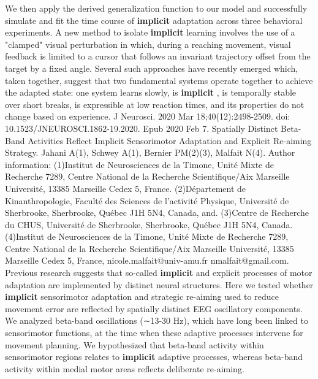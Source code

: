 \documentclass[11pt]{article}
\begin{document}
\newline  [  6  ]   We then apply the  derived generalization function to our model and successfully simulate and fit  the time course of   \textbf {  implicit  }   adaptation across three behavioral experiments.
\newline  [  7  ]   A new method to isolate   \textbf {  implicit  }   learning  involves the use of a "clamped" visual perturbation in which, during a reaching  movement, visual feedback is limited to a cursor that follows an invariant  trajectory offset from the target by a fixed angle.
\newline  [  8  ]   Several such approaches have recently  emerged which, taken together, suggest that two fundamental systems operate  together to achieve the adapted state: one system learns slowly, is   \textbf {  implicit  }  , is  temporally stable over short breaks, is expressible at low reaction times, and  its properties do not change based on experience.
\newline  [  9  ]   J Neurosci. 2020 Mar 18;40(12):2498-2509. doi: 10.1523/JNEUROSCI.1862-19.2020.  Epub 2020 Feb 7.  Spatially Distinct Beta-Band Activities Reflect Implicit Sensorimotor Adaptation  and Explicit Re-aiming Strategy.  Jahani A(1), Schwey A(1), Bernier PM(2)(3), Malfait N(4).  Author information: (1)Institut de Neurosciences de la Timone, Unité Mixte de Recherche 7289, Centre  National de la Recherche Scientifique/Aix Marseille Université, 13385 Marseille  Cedex 5, France. (2)Département de Kinanthropologie, Faculté des Sciences de l'activité Physique,  Université de Sherbrooke, Sherbrooke, Québec J1H 5N4, Canada, and. (3)Centre de Recherche du CHUS, Université de Sherbrooke, Sherbrooke, Québec J1H  5N4, Canada. (4)Institut de Neurosciences de la Timone, Unité Mixte de Recherche 7289, Centre  National de la Recherche Scientifique/Aix Marseille Université, 13385 Marseille  Cedex 5, France, nicole.malfait@univ-amu.fr nmalfait@gmail.com.  Previous research suggests that so-called   \textbf {  implicit  }   and explicit processes of  motor adaptation are implemented by distinct neural structures.
\newline  [  10  ]   Here we tested  whether   \textbf {  implicit  }   sensorimotor adaptation and strategic re-aiming used to reduce  movement error are reflected by spatially distinct EEG oscillatory components.  We analyzed beta-band oscillations (∼13-30 Hz), which have long been linked to  sensorimotor functions, at the time when these adaptive processes intervene for  movement planning.
\newline  [  11  ]   We hypothesized that beta-band activity within sensorimotor  regions relates to   \textbf {  implicit  }   adaptive processes, whereas beta-band activity  within medial motor areas reflects deliberate re-aiming.
\end{document}
